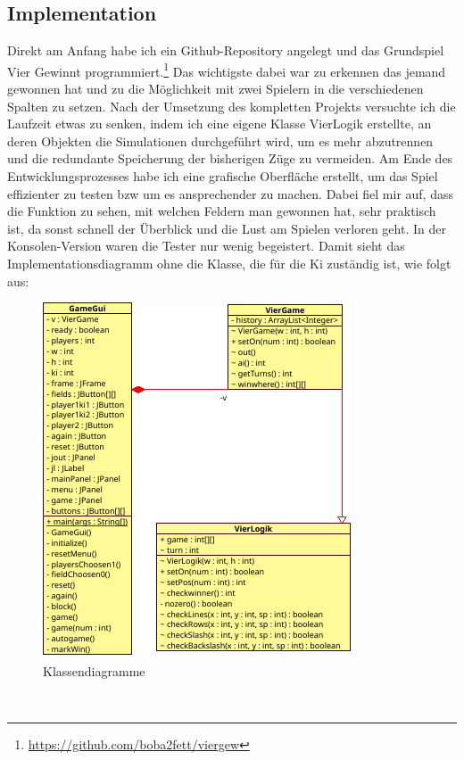 \documentclass[12pt,a4paper]{article}
\begin{document}
	\subsection{Implementation}
	Direkt am Anfang habe ich ein Github-Repository angelegt und das Grundspiel Vier Gewinnt programmiert.\footnote{\url{https://github.com/boba2fett/viergew}} Das wichtigste dabei war zu erkennen das jemand gewonnen hat und zu die Möglichkeit mit zwei Spielern in die verschiedenen Spalten zu setzen.
	Nach der Umsetzung des kompletten Projekts versuchte ich die Laufzeit etwas zu senken, indem ich eine eigene Klasse VierLogik erstellte, an deren Objekten die Simulationen durchgeführt wird, um es mehr abzutrennen und die redundante Speicherung der bisherigen Züge zu vermeiden. Am Ende des Entwicklungsprozesses habe ich eine grafische Oberfläche erstellt, um das Spiel effizienter zu testen bzw um es ansprechender zu machen. Dabei fiel mir auf, dass die Funktion zu sehen, mit welchen Feldern man gewonnen hat, sehr praktisch ist, da sonst schnell der Überblick und die Lust am Spielen verloren geht. In der Konsolen-Version waren die Tester nur wenig begeistert.
	Damit sieht das Implementationsdiagramm ohne die Klasse, die für die Ki zuständig ist, wie folgt aus:
\begin{figure}[h]
	\centering
	\label{Impementationsdiagramm}
	\includegraphics[width=0.7\linewidth, height=0.4\textheight]{maybe/Klassendiagramme}
	\caption{Klassendiagramme}
	\label{fig:klassendiagramme}
\end{figure}
\\
\end{document}
